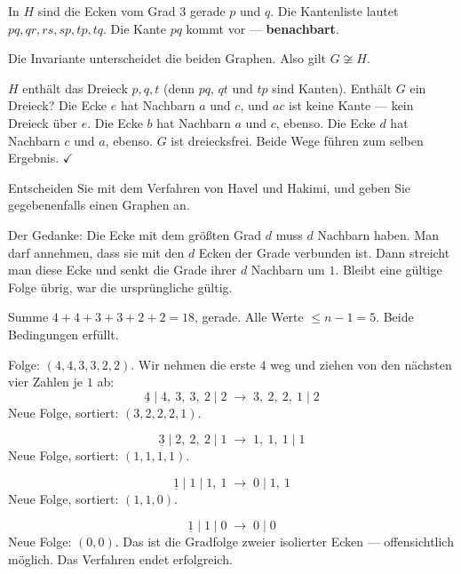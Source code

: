 \begin{aufgabe}
In $H$ sind die Ecken vom Grad $3$ gerade $p$ und $q$. Die Kantenliste lautet $pq, qr, rs, sp, tp, tq$. Die Kante $pq$ kommt vor --- \textbf{benachbart}.

Die Invariante unterscheidet die beiden Graphen. Also gilt $G \not\cong H$.

$H$ enthält das Dreieck $p, q, t$ (denn $pq$, $qt$ und $tp$ sind Kanten). Enthält $G$ ein Dreieck? Die Ecke $e$ hat Nachbarn $a$ und $c$, und $ac$ ist keine Kante --- kein Dreieck über $e$. Die Ecke $b$ hat Nachbarn $a$ und $c$, ebenso. Die Ecke $d$ hat Nachbarn $c$ und $a$, ebenso. $G$ ist dreiecksfrei. Beide Wege führen zum selben Ergebnis. $\checkmark$
\end{aufgabe}

\begin{aufgabe}
Entscheiden Sie mit dem Verfahren von Havel und Hakimi, und geben Sie gegebenenfalls einen Graphen an.

\loesung
{}
Der Gedanke: Die Ecke mit dem größten Grad $d$ muss $d$ Nachbarn haben. Man darf annehmen, dass sie mit den $d$ Ecken der  Grade verbunden ist. Dann streicht man diese Ecke und senkt die Grade ihrer $d$ Nachbarn um $1$. Bleibt eine gültige Folge übrig, war die ursprüngliche gültig.

Summe $4+4+3+3+2+2 = 18$, gerade. Alle Werte $\le n-1 = 5$. Beide Bedingungen erfüllt.

Folge: $(4,4,3,3,2,2)$. Wir nehmen die erste $4$ weg und ziehen von den nächsten vier Zahlen je $1$ ab:
\[ \underline{4} \mid 4,\ 3,\ 3,\ 2 \mid 2 \;\longrightarrow\; 3,\ 2,\ 2,\ 1 \mid 2 \]
Neue Folge, sortiert: $(3,2,2,2,1)$.

\[ \underline{3} \mid 2,\ 2,\ 2 \mid 1 \;\longrightarrow\; 1,\ 1,\ 1 \mid 1 \]
Neue Folge, sortiert: $(1,1,1,1)$.

\[ \underline{1} \mid 1 \mid 1,\ 1 \;\longrightarrow\; 0 \mid 1,\ 1 \]
Neue Folge, sortiert: $(1,1,0)$.

\[ \underline{1} \mid 1 \mid 0 \;\longrightarrow\; 0 \mid 0 \]
Neue Folge: $(0,0)$. Das ist die Gradfolge zweier isolierter Ecken --- offensichtlich möglich. Das Verfahren endet erfolgreich.


\end{aufgabe}
